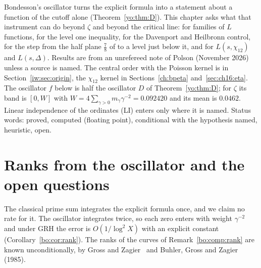 \label{bo:ch:families}

Bondesson's oscillator turns the explicit formula into a statement about a function of the cutoff alone (Theorem~\ref{yo:thm:D}). This chapter asks what that instrument can do beyond $\zeta$ and beyond the critical line: for families of $L$ functions, for the level one inequality, for the Davenport and Heilbronn control, for the step from the half plane $\frac78$ of \cite{OAI26a} to a level just below it, and for $L(s,\chi_{12})$ and $L(s,\Delta)$. Results are from an unrefereed note of Polson (November 2026) unless a source is named. The central order with the Poisson kernel is in Section~\ref{iw:sec:origin}, the $\chi_{12}$ kernel in Sections~\ref{ch:bpeta} and~\ref{sec:ch16:eta}. The oscillator $f$ below is half the oscillator $D$ of Theorem~\ref{yo:thm:D}; for $\zeta$ its band is $[0,W]$ with $W=4\sum_{\gamma>0}m_\gamma\gamma^{-2}=0.092420$ and its mean is $0.0462$. Linear independence of the ordinates (LI) enters only where it is named. Status words: proved, computed (floating point), conditional with the hypothesis named, heuristic, open.

\section{Ranks from the oscillator and the open questions}\label{bo:sec:oscq}

The classical prime sum integrates the explicit formula once, and we claim no rate for it. The oscillator integrates twice, so each zero enters with weight $\gamma^{-2}$ and under GRH the error is $O(1/\log^2X)$ with an explicit constant (Corollary~\ref{bo:cor:rank}). The ranks of the curves of Remark~\ref{bo:comp:rank} are known unconditionally, by Gross and Zagier~\cite{GrossZagier86} and Buhler, Gross and Zagier (1985).%

